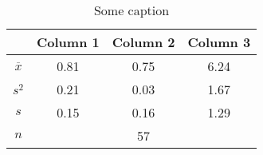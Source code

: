 \begin{small}
  \begin{table}[ht]
    \centering
    \renewcommand{\arraystretch}{0.7}
      \begin{tabular}{c c c c}
        \toprule
        &Column 1&Column 2&Column 3\\
        \midrule
        $\overline{x}$&0.81&0.75&6.24\\
        $s^2$&0.21&0.03&1.67\\
        $s$&0.15&0.16&1.29\\
        $n$&\multicolumn{3}{c}{57}\\
        \bottomrule
      \end{tabular}
    \caption{Some caption}\label{tab:foobar}
  \end{table}
\end{small}